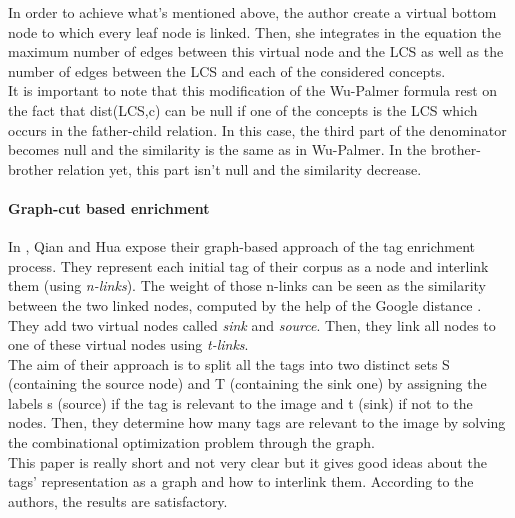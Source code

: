 In order to achieve what's mentioned above, the author create a virtual bottom node to which every leaf node is linked. Then, she integrates in the equation the maximum number of edges between this virtual node and the LCS as well as the number of edges between the LCS and each of the considered concepts. \\

It is important to note that this modification of the Wu-Palmer formula rest on the fact that dist(LCS,c) can be null if one of the concepts is the LCS which occurs in the father-child relation. In this case, the third part of the denominator becomes null and the similarity is the same as in Wu-Palmer. In the brother-brother relation yet, this part isn't null and the similarity decrease.

\paragraph{Graph-cut based enrichment} %
\label{par:graph_cut_based_enrichment}
In \cite{qian}, Qian and Hua expose their graph-based approach of the tag enrichment process. They represent each initial tag of their corpus as a node and interlink them (using \emph{n-links}). The weight of those n-links can be seen as the similarity between the two linked nodes, computed by the help of the Google distance \cite{cili}. They add two virtual nodes called \emph{sink} and \emph{source}. Then, they link all nodes to one of these virtual nodes using \emph{t-links}.\\

The aim of their approach is to split all the tags into two distinct sets S (containing the source node) and T (containing the sink one) by assigning the labels s (source) if the tag is relevant to the image and t (sink) if not to the nodes. Then, they determine how many tags are relevant to the image by solving the combinational optimization problem through the graph.\\

This paper is really short and not very clear but it gives good ideas about the tags' representation as a graph and how to interlink them. According to the authors, the results are satisfactory.   

